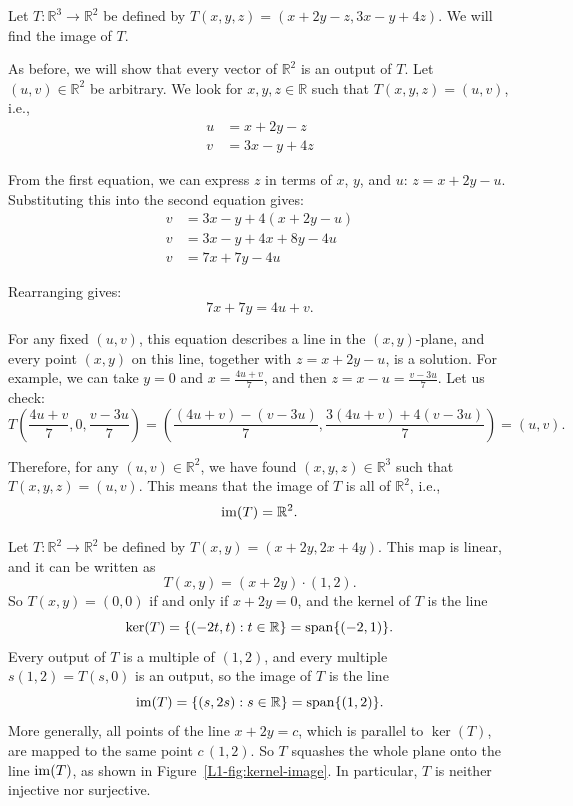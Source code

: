 \begin{example}\label{L1-ex:im2}
    Let $T: \mathbb{R}^3 \to \mathbb{R}^2$ be defined by $T(x, y, z) = (x + 2y - z, 3x - y + 4z)$. We will find the image of $T$.

    As before, we will show that every vector of $\mathbb{R}^2$ is an output of $T$. Let $(u, v) \in \mathbb{R}^2$ be arbitrary. We look for $x, y, z \in \mathbb{R}$ such that $T(x, y, z) = (u, v)$, i.e.,
    \begin{align*}
        u &= x + 2y - z \\
        v &= 3x - y + 4z
    \end{align*}

    From the first equation, we can express $z$ in terms of $x$, $y$, and $u$: $z = x + 2y - u$. Substituting this into the second equation gives:
    \begin{align*}
        v &= 3x - y + 4(x + 2y - u) \\
        v &= 3x - y + 4x + 8y - 4u \\
        v &= 7x + 7y - 4u
    \end{align*}

    Rearranging gives:
    \[7x + 7y = 4u + v.\]

    For any fixed $(u, v)$, this equation describes a line in the $(x, y)$-plane, and every point $(x, y)$ on this line, together with $z = x + 2y - u$, is a solution. For example, we can take $y = 0$ and $x = \frac{4u + v}{7}$, and then $z = x - u = \frac{v - 3u}{7}$. Let us check:
    \[T\left(\frac{4u + v}{7}, 0, \frac{v - 3u}{7}\right) = \left(\frac{(4u + v) - (v - 3u)}{7}, \frac{3(4u + v) + 4(v - 3u)}{7}\right) = (u, v).\]

    Therefore, for any $(u, v) \in \mathbb{R}^2$, we have found $(x, y, z) \in \mathbb{R}^3$ such that $T(x, y, z) = (u, v)$. This means that the image of $T$ is all of $\mathbb{R}^2$, i.e.,
    \[\operatorname{im}(T) = \mathbb{R}^2.\]
\end{example}

\begin{example}\label{L1-ex:kerim-picture}
    Let $T: \mathbb{R}^2 \to \mathbb{R}^2$ be defined by $T(x, y) = (x + 2y, 2x + 4y)$. This map is linear, and it can be written as
    \[T(x, y) = (x + 2y) \cdot (1, 2).\]
    So $T(x, y) = (0, 0)$ if and only if $x + 2y = 0$, and the kernel of $T$ is the line
    \[\ker(T) = \{(-2t, t) : t \in \mathbb{R}\} = \operatorname{span}\{(-2, 1)\}.\]
    Every output of $T$ is a multiple of $(1, 2)$, and every multiple $s(1, 2) = T(s, 0)$ is an output, so the image of $T$ is the line
    \[\operatorname{im}(T) = \{(s, 2s) : s \in \mathbb{R}\} = \operatorname{span}\{(1, 2)\}.\]
    More generally, all points of the line $x + 2y = c$, which is parallel to $\ker(T)$, are mapped to the same point $c\,(1, 2)$. So $T$ squashes the whole plane onto the line $\operatorname{im}(T)$, as shown in Figure~\ref{L1-fig:kernel-image}. In particular, $T$ is neither injective nor surjective.
\end{example}

